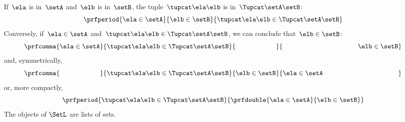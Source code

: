 {    If~$\ela$ is in~$\setA$ and~$\elb$ is in~$\setB$, the tuple~$\tupcat \ela \elb$ is in~$\Tupcat \setA \setB$:
    \begin{equation}
        \label{eq:sets-monoid-axiom1}
        \prfperiod{
            \ela \in \setA
        }{
            \elb \in \setB
        }{
            \tupcat \ela \elb \in \Tupcat \setA \setB
        }
    \end{equation}
    Conversely, if~$\ela \in \setA$ and~$\tupcat \ela \elb \in \Tupcat \setA \setB$, we can conclude that~$\elb \in \setB$:
    \begin{equation}
        \label{eq:sets-monoid-axiom2}
        \prfcomma{
            \ela \in \setA
        }{
            \tupcat \ela \elb \in \Tupcat \setA  \setB
        }{
            \phantom{\elb \in \setB}
        }{
            \rule{39mm}{0pt} \elb \in  \setB
        }
    \end{equation}
    and, symmetrically,
    \begin{equation}
        \label{eq:sets-monoid-axiom3}
        \prfcomma{
            \phantom{\ela \in \setA}
        }{
            \tupcat \ela \elb \in \Tupcat \setA \setB
        }{
            \elb \in \setB
        }{
            \ela \in  \setA \rule{39mm}{0pt}
        }
    \end{equation}
    or, more compactly,
    \begin{equation}
        \label{eq:sets-monoid-axiom3bis}
        \prfperiod{
            \tupcat \ela \elb \in \Tupcat \setA \setB
        }{
            \prfdouble{
                \ela \in \setA
            }{
                \elb \in \setB
            }
        }
    \end{equation}
}
The objects of $\SetL$ are lists of sets.
%
